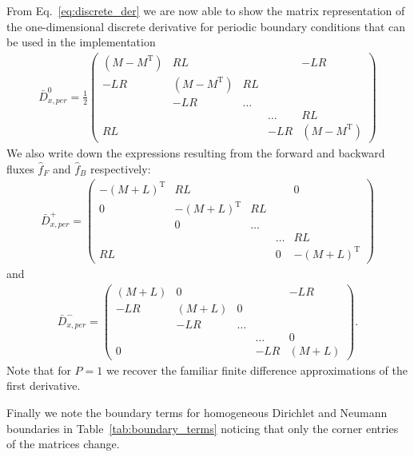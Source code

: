 From Eq.~\eqref{eq:discrete_der} we are now able to show the matrix representation of the one-dimensional discrete derivative for 
periodic boundary conditions that can be used
in the implementation
\begin{align}
    \bar D^0_{x,per} = \frac{1}{2}\begin{pmatrix}
		(M-M^{\mathrm{T}}) & RL      &    &   & -LR \\
		-LR  & (M-M^{\mathrm{T}}) & RL &   &     \\
             &  -LR    & \dots   &   &     \\
             &         &    & \dots  & RL    \\
			 RL &         &    & -LR&(M-M^{\mathrm{T}}) 
    \end{pmatrix}
    \label{eq:dxcentered}
\end{align}
We also write down the expressions resulting from the forward and backward fluxes $\hat f_F$ and $\hat f_B$ respectively:
\begin{align}
    \bar D^+_{x,per} = \begin{pmatrix}
        -(M+L)^{\mathrm{T}} & RL      &    &   & 0 \\
		 0   & -(M+L)^{\mathrm{T}} & RL &   &     \\
             &    0   & \dots   &   &     \\
             &         &    & \dots  & RL    \\
			 RL  &         &    & 0 & -(M+L)^{\mathrm{T}}
    \end{pmatrix}
    \label{eq:dxplus}
\end{align}
and
\begin{align}
    \bar D^-_{x,per} = \begin{pmatrix}
		(M+L) & 0      &    &   & -LR \\
		-LR  & (M+L) & 0 &   &     \\
             &   -LR   & \dots   &   &     \\
             &         &    & \dots  & 0    \\
			 0  &         &    & -LR &(M+L)
    \end{pmatrix}.
    \label{eq:dxminus}
\end{align}
Note that for $P=1$ we recover the familiar finite difference approximations of the first derivative.

Finally we note the boundary terms for homogeneous Dirichlet and Neumann boundaries
in Table~\eqref{tab:boundary_terms} noticing that only the
corner entries of the matrices change.

